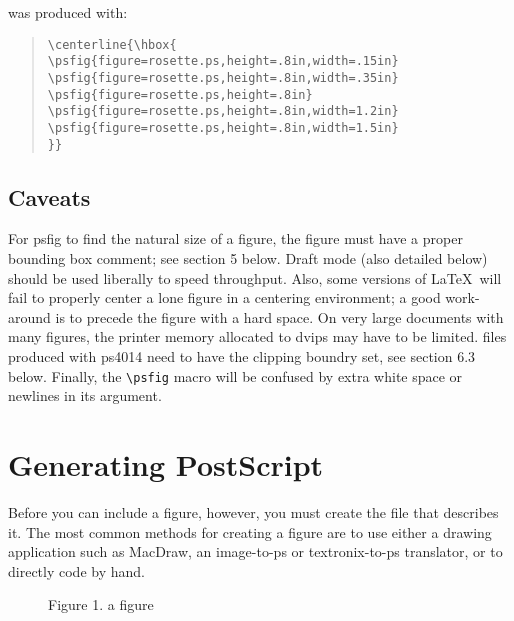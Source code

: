 \par
was produced with:
\begin{quote}\small
\tt\verb+\+centerline\{\verb+\+hbox\{ \\
\verb+\+psfig\{figure=rosette.ps,height=.8in,width=.15in\}\\
\verb+\+psfig\{figure=rosette.ps,height=.8in,width=.35in\}\\
\verb+\+psfig\{figure=rosette.ps,height=.8in\} \\
\verb+\+psfig\{figure=rosette.ps,height=.8in,width=1.2in\}\\
\verb+\+psfig\{figure=rosette.ps,height=.8in,width=1.5in\}\\
\}\} 
\end{quote}
\par
\subsection{Caveats}
For psfig to find the natural size of a figure, the figure must have a
proper bounding box comment; see section 5 below. Draft mode (also 
detailed below) should be used liberally to speed throughput. 
Also, some versions
of \LaTeX\ will fail to properly center a lone figure in a centering 
environment;
a good work-around is to precede the figure with a hard space. On very large documents with many figures, the printer memory
allocated to dvips may have to be limited. 
\Ps files produced with ps4014 need to have the clipping boundry set,
see section 6.3 below.
Finally, the
\verb+\psfig+ macro will be confused by extra white space or newlines in its
argument.
\par
\section{Generating PostScript}
Before you can include a figure, however, you must create
the \Ps file that describes it.
The most common methods for creating a \Ps figure are to 
use either a drawing application such as MacDraw, an image-to-ps or
textronix-to-ps translator, or to 
directly code \Ps by hand.
\begin{figure}
\centerline{}
\centerline{Figure 1. a \Ps figure}
\end{figure}
\par
